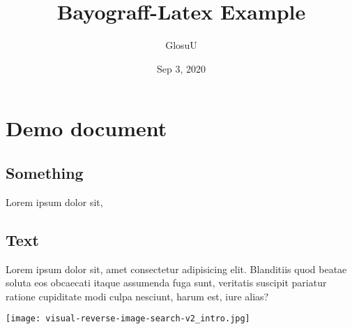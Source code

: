 \documentclass[12pt, a4paper]{article}
\author{GlosuU}
\title{Bayograff-Latex Example}
\date{Sep 3, 2020}
\begin{document}
\maketitle
\tableofcontents
\section{Demo document}

\subsection{Something}
Lorem ipsum dolor sit,

\subsection{Text}
Lorem ipsum dolor sit, amet consectetur adipisicing elit. Blanditiis quod beatae soluta eos obcaecati itaque assumenda fuga sunt, veritatis suscipit pariatur ratione cupiditate modi culpa nesciunt, harum est, iure alias?

\texttt{[image: visual-reverse-image-search-v2\_intro.jpg]}
\end{document}
